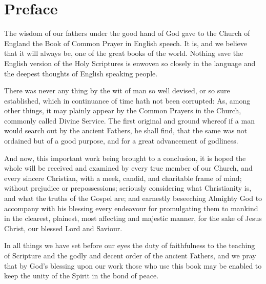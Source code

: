 \chapter{Preface}

The wisdom of our fathers under the good hand of God gave to the Church of England the Book of Common Prayer in English speech. It is, and we believe that it will always be, one of the great books of the world. Nothing save the English version of the Holy Scriptures is enwoven so closely in the language and the deepest thoughts of English speaking people.

There was never any thing by the wit of man so well devised, or so sure established, which in continuance of time hath not been corrupted: As, among other things, it may plainly appear by the Common Prayers in the Church, commonly called Divine Service. The first original and ground whereof if a man would search out by the ancient Fathers, he shall find, that the same was not ordained but of a good purpose, and for a great advancement of godliness. 

And now, this important work being brought to a conclusion, it is hoped the whole will be received and examined by every true member of our Church, and every sincere Christian, with a meek, candid, and charitable frame of mind; without prejudice or prepossessions; seriously considering what Christianity is, and what the truths of the Gospel are; and earnestly beseeching Almighty God to accompany with his blessing every endeavour for promulgating them to mankind in the clearest, plainest, most affecting and majestic manner, for the sake of Jesus Christ, our blessed Lord and Saviour.  

In all things we have set before our eyes the duty of faithfulness to the teaching of Scripture and the godly and decent order of the ancient Fathers, and we pray that by God's blessing upon our work those who use this book may be enabled to keep the unity of the Spirit in the bond of peace.

